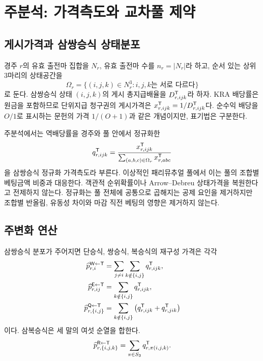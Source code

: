 \section{주분석: 가격측도와 교차풀 제약}

\subsection{게시가격과 삼쌍승식 상태분포}

경주 $r$의 유효 출전마 집합을 $N_r$, 유효 출전마 수를 $n_r=|N_r|$라 하고,
순서 있는 상위 3마리의 상태공간을
\[
  \Omega_r=\{(i,j,k)\in N_r^3:i,j,k\text{는 서로 다르다}\}
\]
로 둔다. 삼쌍승식 상태 $(i,j,k)$의 게시 총지급배율을 $D^{\mathsf{T}}_{r,ijk}$라 하자.
KRA 배당률은 원금을 포함하므로 단위지급 청구권의 게시가격은
$x^{\mathsf{T}}_{r,ijk}=1/D^{\mathsf{T}}_{r,ijk}$다. 순수익 배당을 $O/1$로 표시하는 문헌의
가격 $1/(O+1)$과 같은 개념이지만, 표기법은 구분한다.

주분석에서는 역배당률을 경주와 풀 안에서 정규화한
\begin{equation}
  q^{\mathsf{T}}_{r,ijk}
  =\frac{x^{\mathsf{T}}_{r,ijk}}
  {\sum_{(a,b,c)\in\Omega_r}x^{\mathsf{T}}_{r,abc}}
  \label{eq:trifecta-state-price}
\end{equation}
을 삼쌍승식 정규화 가격측도라 부른다. 이상적인 패리뮤추얼 풀에서 이는 풀의
조합별 베팅금액 비중과 대응한다. 객관적 순위확률이나 Arrow--Debreu 상태가격을
복원한다고 전제하지 않는다. 정규화는 풀 전체에 공통으로 곱해지는 공제 요인을
제거하지만 조합별 반올림, 유동성 차이와 마감 직전 베팅의 영향은 제거하지 않는다.

\subsection{주변화 연산}

삼쌍승식 분포가 주어지면 단승식, 쌍승식, 복승식의 재구성 가격은 각각
\begin{align}
  \widehat p^{\mathsf{W}\leftarrow\mathsf{T}}_{r,i}
    &=\sum_{j\ne i}\sum_{k\notin\{i,j\}}q^{\mathsf{T}}_{r,ijk},
    \label{eq:win-marginal}\\
  \widehat p^{\mathsf{E}\leftarrow\mathsf{T}}_{r,ij}
    &=\sum_{k\notin\{i,j\}}q^{\mathsf{T}}_{r,ijk},
    \label{eq:exacta-marginal}\\
  \widehat p^{\mathsf{Q}\leftarrow\mathsf{T}}_{r,\{i,j\}}
    &=\sum_{k\notin\{i,j\}}
      \left(q^{\mathsf{T}}_{r,ijk}+q^{\mathsf{T}}_{r,jik}\right)
    \label{eq:quinella-marginal}
\end{align}
이다. 삼복승식은 세 말의 여섯 순열을 합한다.
\begin{equation}
  \widehat p^{\mathsf{R}\leftarrow\mathsf{T}}_{r,\{i,j,k\}}
  =\sum_{\pi\in S_3}q^{\mathsf{T}}_{r,\pi(i,j,k)}.
  \label{eq:trio-marginal}
\end{equation}

